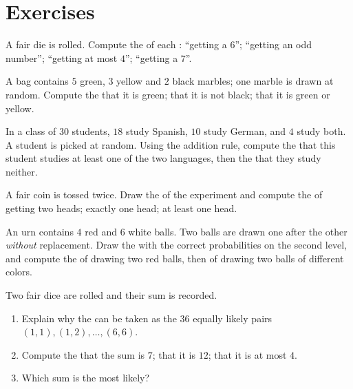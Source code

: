 \section{Exercises}

\begin{exercise}[$\star$]\label{exo:g10:proba:1}
A fair die is rolled. Compute the  of each : ``getting a
$6$''; ``getting an odd number''; ``getting at most $4$''; ``getting a
$7$''.
\end{exercise}

\begin{exercise}[$\star$]\label{exo:g10:proba:2}
A bag contains $5$ green, $3$ yellow and $2$ black marbles; one marble is
drawn at random. Compute the  that it is green; that it is not
black; that it is green or yellow.
\end{exercise}

\begin{exercise}[$\star$]\label{exo:g10:proba:3}
In a class of $30$ students, $18$ study Spanish, $10$ study German, and
$4$ study both. A student is picked at random. Using the addition rule,
compute the  that this student studies at least one of the two
languages, then the  that they study neither.
\end{exercise}

\begin{exercise}[$\star$]\label{exo:g10:proba:4}
A fair coin is tossed twice. Draw the  of the experiment and compute
the  of getting two heads; exactly one head; at least one
head.
\end{exercise}

\begin{exercise}[$\star\star$]\label{exo:g10:proba:5}
An urn contains $4$ red and $6$ white balls. Two balls are drawn one after
the other \emph{without} replacement. Draw the  with the correct
probabilities on the second level, and compute the  of drawing
two red balls, then of drawing two balls of different colors.
\end{exercise}

\begin{exercise}[$\star\star$]\label{exo:g10:proba:6}
Two fair dice are rolled and their sum is recorded.
\begin{enumerate}
  \item Explain why the  can be taken as the $36$ equally
        likely pairs $(1,1), (1,2), \dots, (6,6)$.
  \item Compute the  that the sum is $7$; that it is $12$;
        that it is at most $4$.
  \item Which sum is the most likely?
\end{enumerate}
\end{exercise}

